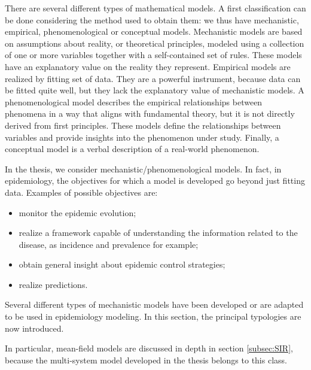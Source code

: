 There are several different types of mathematical models.
A first classification can be done considering the method used to obtain them: we thus have mechanistic, empirical, phenomenological or conceptual models.
Mechanistic models are based on assumptions about reality, or theoretical principles, modeled using a collection of one or more variables together with a self-contained set of rules. These models have an explanatory value on the reality they represent.
Empirical models are realized by fitting set of data. They are a powerful instrument, because data can be fitted quite well, but they lack the explanatory value of mechanistic models.
A phenomenological model describes the empirical relationships between phenomena in a way that aligns with fundamental theory, but it is not directly derived from first principles. These models define the relationships between variables and provide insights into the phenomenon under study. 
Finally, a conceptual model is a verbal description of a real-world phenomenon. 

In the thesis, we consider mechanistic/phenomenological models. In fact, in epidemiology, the objectives for which a model is developed go beyond just fitting data. Examples of possible objectives are:
\begin{itemize}
	\item monitor the epidemic evolution;
	\item realize a framework capable of understanding the information related to the disease, as incidence and prevalence for example;
	\item obtain general insight about epidemic control strategies;
	\item realize predictions.
\end{itemize}
Several different types of mechanistic models have been developed or are adapted to be used in epidemiology modeling. In this section, the principal typologies are now introduced. 

In particular, mean-field models are discussed in depth in section \ref{subsec:SIR}, because the multi-system model developed in the thesis belongs to this class.


